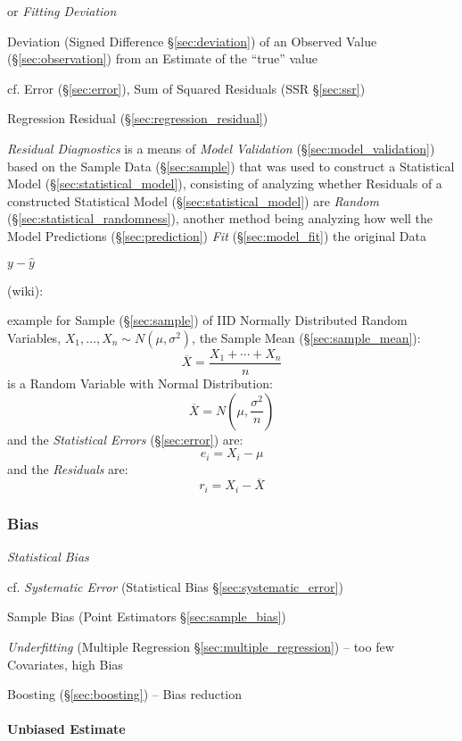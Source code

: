 or \emph{Fitting Deviation}

Deviation (Signed Difference \S\ref{sec:deviation}) of an Observed Value
(\S\ref{sec:observation}) from an Estimate of the ``true'' value

cf. Error (\S\ref{sec:error}), Sum of Squared Residuals (SSR \S\ref{sec:ssr})

\fist Regression Residual (\S\ref{sec:regression_residual})

\emph{Residual Diagnostics} is a means of \emph{Model Validation}
(\S\ref{sec:model_validation}) based on the Sample Data (\S\ref{sec:sample})
that was used to construct a Statistical Model (\S\ref{sec:statistical_model}),
consisting of analyzing whether Residuals of a constructed Statistical Model
(\S\ref{sec:statistical_model}) are \emph{Random}
(\S\ref{sec:statistical_randomness}), another method being analyzing how well
the Model Predictions (\S\ref{sec:prediction}) \emph{Fit}
(\S\ref{sec:model_fit}) the original Data

$y - \hat{y}$

(wiki):

example for Sample (\S\ref{sec:sample}) of IID Normally Distributed Random
Variables, $X_1, \ldots, X_n \sim N(\mu, \sigma^2)$, the Sample Mean
(\S\ref{sec:sample_mean}):
\[
  \overline{X} = \frac{X_1 + \cdots + X_n}{n}
\]
is a Random Variable with Normal Distribution:
\[
  \overline{X} = N(\mu, \frac{\sigma^2}{n})
\]
and the \emph{Statistical Errors} (\S\ref{sec:error}) are:
\[
  e_i = X_i - \mu
\]
and the \emph{Residuals} are:
\[
  r_i = X_i - \overline{X}
\]



\subsubsection{Bias}\label{sec:bias}

\emph{Statistical Bias}

cf. \emph{Systematic Error} (Statistical Bias \S\ref{sec:systematic_error})

Sample Bias (Point Estimators \S\ref{sec:sample_bias})

\emph{Underfitting} (Multiple Regression \S\ref{sec:multiple_regression}) -- too
few Covariates, high Bias

Boosting (\S\ref{sec:boosting}) -- Bias reduction



\paragraph{Unbiased Estimate}\label{sec:unbiased_estimate}\hfill

